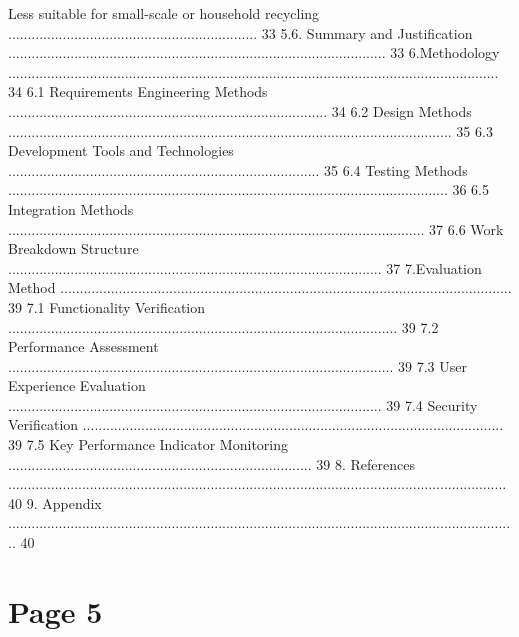 \documentclass{article}
\begin{document}
Less suitable for small-scale or household recycling ................................................................ 33 
5.6. Summary and Justification ................................................................................................. 33 
6.Methodology .............................................................................................................................. 34 
6.1 Requirements Engineering Methods .................................................................................. 34 
6.2 Design Methods .................................................................................................................. 35 
6.3 Development Tools and Technologies ................................................................................ 35 
6.4 Testing Methods ................................................................................................................. 36 
6.5 Integration Methods ........................................................................................................... 37 
6.6 Work Breakdown Structure ................................................................................................ 37 
7.Evaluation Method .................................................................................................................... 39 
7.1 Functionality Verification .................................................................................................... 39 
7.2 Performance Assessment ................................................................................................... 39 
7.3 User Experience Evaluation ................................................................................................ 39 
7.4 Security Verification ............................................................................................................ 39 
7.5 Key Performance Indicator Monitoring .............................................................................. 39 
8. References ................................................................................................................................ 40 
9. Appendix ................................................................................................................................... 40 
 
 
 
 
 
 
 
 
 
 
 

\section*{Page 5}
   
\end{document}
